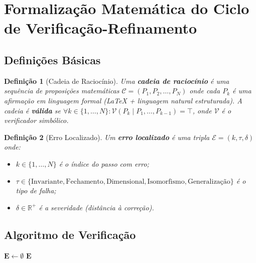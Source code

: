 \documentclass[5p]{elsarticle}
\newtheorem{definition}{Definição}[section]
\theoremstyle{remark}
\begin{document}
\section{Formalização Matemática do Ciclo de Verificação-Refinamento}

\subsection{Definições Básicas}

\begin{definition}[Cadeia de Raciocínio]
Uma \textbf{cadeia de raciocínio} é uma sequência de proposições matemáticas $\mathcal{C} = (P_1, P_2, \ldots, P_N)$ onde cada $P_k$ é uma afirmação em linguagem formal (LaTeX + linguagem natural estruturada). A cadeia é \textbf{válida} se $\forall k \in \{1,\ldots,N\}: \mathcal{V}(P_k \mid P_1, \ldots, P_{k-1}) = \top$, onde $\mathcal{V}$ é o verificador simbólico.
\end{definition}

\begin{definition}[Erro Localizado]
Um \textbf{erro localizado} é uma tripla $\mathcal{E} = (k, \tau, \delta)$ onde:
\begin{itemize}
    \item $k \in \{1,\ldots,N\}$ é o índice do passo com erro;
    \item $\tau \in \{\text{Invariante}, \text{Fechamento}, \text{Dimensional}, \text{Isomorfismo}, \text{Generalização}\}$ é o tipo de falha;
    \item $\delta \in \mathbb{R}^+$ é a severidade (distância à correção).
\end{itemize}
\end{definition}

\subsection{Algoritmo de Verificação}

\begin{algorithm}[t]
\SetAlgoLined
{}
$\mathbf{E} \leftarrow \emptyset$\;
\Return $\mathbf{E}$\;
\caption{verify\_chain($\mathcal{C}, \{\mathcal{V}_j\}$)}
\label{alg:verify}
\end{algorithm}
\end{document}
